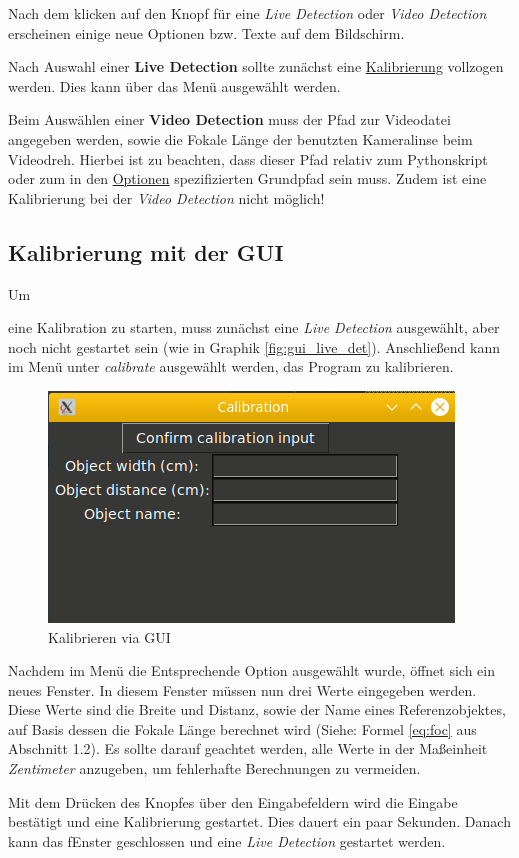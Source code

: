 \documentclass[12pt]{article}
\theoremstyle{definition}
\begin{document}
\begin{flushleft}
Nach dem klicken auf den Knopf für eine \textit{Live Detection} oder \textit{Video Detection} erscheinen einige neue Optionen bzw. Texte auf dem Bildschirm.

Nach Auswahl einer \textbf{Live Detection} sollte zunächst eine \hyperlink{calib_gui}{Kalibrierung} vollzogen werden. Dies kann über das Menü ausgewählt werden.

Beim Auswählen einer \textbf{Video Detection} muss der Pfad zur Videodatei angegeben werden, sowie die Fokale Länge der benutzten Kameralinse beim Videodreh. Hierbei ist zu beachten, dass dieser Pfad relativ zum Pythonskript oder zum in den \hyperlink{opt_gui}{Optionen} spezifizierten Grundpfad sein muss. Zudem ist eine Kalibrierung bei der \textit{Video Detection} nicht möglich!
\end{flushleft}

\subsection{Kalibrierung mit der GUI}
\begin{flushleft}
\hypertarget{calib_gui}{Um} eine Kalibration zu starten, muss zunächst eine \textit{Live Detection} ausgewählt, aber noch nicht gestartet sein (wie in Graphik \ref{fig:gui_live_det}). Anschließend kann im Menü unter \textit{calibrate} ausgewählt werden, das Program zu kalibrieren.

\begin{figure}[h]
\centering
\includegraphics[scale=0.7]{gui_calibrate}
\caption{Kalibrieren via GUI}
\label{fig:gui_home}
\end{figure}

Nachdem im Menü die Entsprechende Option ausgewählt wurde, öffnet sich ein neues Fenster. In diesem Fenster müssen nun drei Werte eingegeben werden. Diese Werte sind die Breite und Distanz, sowie der Name eines Referenzobjektes, auf Basis dessen die Fokale Länge berechnet wird (Siehe: Formel \ref{eq:foc} aus Abschnitt 1.2). Es sollte darauf geachtet werden, alle Werte in der Maßeinheit \textit{Zentimeter} anzugeben, um fehlerhafte Berechnungen zu vermeiden.

Mit dem Drücken des Knopfes über den Eingabefeldern wird die Eingabe bestätigt und eine Kalibrierung gestartet. Dies dauert ein paar Sekunden. Danach kann das fEnster geschlossen und eine \textit{Live Detection} gestartet werden.
\end{flushleft}
\end{document}
